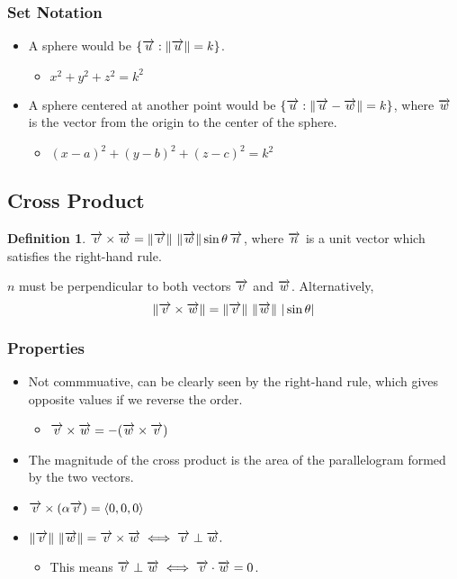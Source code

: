 \documentclass[12pt]{article}
\theoremstyle{plain} %
\theoremstyle{definition}
\newtheorem*{definition}{Definition} %
\theoremstyle{definition}
\theoremstyle{remark}
\newcommand{\vecv}{\vv{v}}
\newcommand{\vecu}{\vv{u}}
\newcommand{\vecw}{\vv{w}}
\newcommand{\angled}[1]{\left\langle {#1} \right\rangle}
\newcommand*{\vv}[1]{\overrightarrow{\mkern0mu#1}}
\renewcommand{\norm}[1]{\left\lVert#1\right\rVert}
\begin{document}
\subsubsection{Set Notation}
\begin{itemize}
    \item A sphere would be $\{\vecu : \norm{\vecu} = k\}$.
    \begin{itemize}
        \item $x^2+y^2+z^2=k^2$
    \end{itemize}
    \item A sphere centered at another point would be $\{\vecu: \norm{\vecu-\vv{w}} = k\}$,
where $\vv{w}$ is the vector from the origin to the center of the sphere.
    \begin{itemize}
        \item $(x-a)^2+(y-b)^2+(z-c)^2=k^2$
    \end{itemize}
\end{itemize}

\subsection{Cross Product}
\begin{definition}
    $\vecv \times \vv{w} = \norm{\vecv} \, \norm{\vv{w}} \sin{\theta} \, \vv{n}$,
    where $\vv{n}$ is a unit vector which satisfies the right-hand rule.
\end{definition}
$n$ must be perpendicular to both vectors $\vecv$ and $\vv{w}$.
Alternatively,
\[  \norm{\vecv \times \vv{w}} = \norm{\vecv} \, \norm{\vv{w}} \, |\sin{\theta}| \]

\subsubsection{Properties}
\begin{itemize}
    \item Not commmuative, can be clearly seen by the right-hand rule, which gives opposite values if we reverse the order.
    \begin{itemize}
        \item $\vecv \times \vecw = -(\vecw \times \vecv)$
    \end{itemize}
    \item The magnitude of the cross product is the area of the parallelogram formed by the two vectors.
    \item $\vecv \times (\alpha \vecv) = \angled{0,0,0}$
    \item $\norm{\vecv} \, \norm{\vecw} = \vecv \times \vecw \iff \vecv \perp \vecw.$
    \begin{itemize}
        \item This means $\vecv \perp \vecw \iff \vecv \cdot \vecw = 0$.
    \end{itemize}
\end{itemize}
\end{document}

